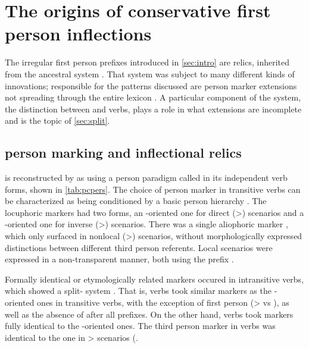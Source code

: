 \section{The origins of conservative first person inflections}
\label{sec:background}
The irregular first person prefixes introduced in \cref{sec:intro} are relics, inherited from the ancestral \PC system .
That system was subject to many different kinds of innovations; responsible for the patterns discussed are person marker extensions not spreading through the entire  lexicon .
A particular component of the system, the distinction between  and  verbs, plays a role in what extensions are incomplete and is the topic of \cref{sec:split}.

\subsection{\PC person marking and inflectional relics}
\label{sec:pc_person}
\PC is reconstructed by \textcite{gildea1998} as using a person paradigm called \setone in its independent verb forms, shown in \cref{tab:pcpers}.
The choice of person marker in transitive verbs can be characterized as being conditioned by a basic person hierarchy .
The locuphoric markers had two forms, an -oriented one for direct (>) scenarios and a -oriented one for inverse (>) scenarios.
There was a single aliophoric marker , which only surfaced in nonlocal (>) scenarios, without morphologically expressed distinctions between different third person referents.
Local scenarios were expressed in a non-transparent manner, both using the  prefix .



Formally identical or etymologically related markers occured in intransitive verbs, which showed a split- system .
That is,  verbs took similar markers as the -oriented ones in transitive verbs, with the exception of first person (>  vs  ), as well as the absence of  after all  prefixes.
On the other hand,  verbs took markers fully identical to the -oriented ones.
The third person marker in  verbs was identical to the one in > scenarios (.

